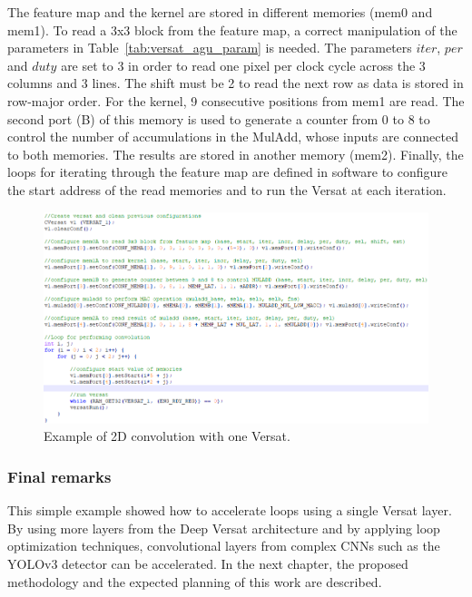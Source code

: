 The feature map and the kernel are stored in different memories (mem0 and mem1). To read a 3x3 block from the feature map, a correct manipulation of the parameters in Table~\ref{tab:versat_agu_param} is needed. The parameters $iter$, $per$ and $duty$ are set to 3 in order to read one pixel per clock cycle across the 3 columns and 3 lines. The shift must be 2 to read the next row as data is stored in row-major order. For the kernel, 9 consecutive positions from mem1 are read. The second port (B) of this memory is used to generate a counter from 0 to 8 to control the number of accumulations in the MulAdd, whose inputs are connected to both memories. The results are stored in another memory (mem2). Finally, the loops for iterating through the feature map are defined in software to configure the start address of the read memories and to run the Versat at each iteration. 

\vspace{+0.1cm}

\begin{figure}[!htb]
  \centering
  \includegraphics[width=\textwidth]{Figures/versat_convolution.png}
  \caption{Example of 2D convolution with one Versat.}
  \label{fig:convolution_versat}
\end{figure}
\vspace{-0.4cm}

\subsubsection{Final remarks}

This simple example showed how to accelerate loops using a single Versat layer. By using more layers from the Deep Versat architecture and by applying loop optimization techniques, convolutional layers from complex CNNs such as the YOLOv3 detector can be accelerated. In the next chapter, the proposed methodology and the expected planning of this work are described.
